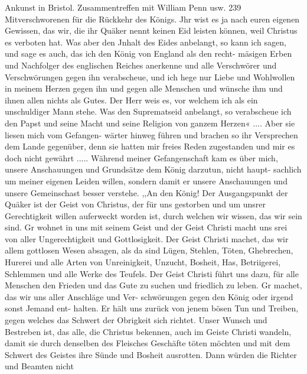 Ankunst in Bristol. Zusammentreffen mit William Penn usw. 239
Mitverschworenen für die Rückkehr des Königs. Jhr wist es ja
nach euren eigenen Gewissen, das wir, die ihr Quäker nennt
keinen Eid leisten können, weil Christus es verboten hat. Was
aber den Jnhalt des Eides anbelangt, so kann ich sagen, und
sage es auch, das ich den König von England als den recht-
mäsigen Erben und Nachfolger des englischen Reiches anerkenne
und alle Verschwörer und Verschwörungen gegen ihn verabscheue,
und ich hege nur Liebe und Wohlwollen in meinem Herzen gegen
ihn und gegen alle Menschen und wünsche ihm und ihnen allen
nichts als Gutes. Der Herr weis es, vor welchem ich als ein
unschuldiger Mann stehe. Was den Suprematseid anbelangt, so
verabscheue ich den Papst und seine Macht und seine Religion
von ganzem Herzen« .... Aber sie liesen mich vom Gefangen-
wärter hinweg führen und brachen so ihr Versprechen dem Lande
gegenüber, denn sie hatten mir freies Reden zugestanden und mir
es doch nicht gewährt .....
Während meiner Gefangenschaft kam es über mich, unsere
Anschauungen und Grundsätze dem König darzutun, nicht haupt-
sachlich um meiner eigenen Leiden willen, sondern damit er unsere
Anschauungen und unsere Gemeinschast besser verstehe.
,,An den König!
Der Ausgangspunkt der Quäker ist der Geist von Christus,
der für uns gestorben und um unsrer Gerechtigkeit willen auferweckt
worden ist, durch welchen wir wissen, das wir sein sind. Gr
wohnet in uns mit seinem Geist und der Geist Christi macht uns
srei von aller Ungerechtigkeit und Gottlosigkeit. Der Geist Christi
machet, das wir allem gottlosen Wesen absagen, als da sind
Lügen, Stehlen, Töten, Ghebrechen, Hurerei und alle Arten von
Unreinigkeit, Unzucht, Bosheit, Has, Betriigerei, Schlemmen und
alle Werke des Teufels. Der Geist Christi führt uns dazu, für
alle Menschen den Frieden und das Gute zu suchen und friedlich
zu leben. Gr machet, das wir uns aller Anschläge und Ver-
schwörungen gegen den König oder irgend sonst Jemand ent-
halten. Er hält uns zurück von jenem bösen Tun und Treiben,
gegen welches das Schwert der Obrigkeit sich richtet. Unser Wunsch
und Bestreben ist, das alle, die Christus bekennen, auch im Geiste
Christi wandeln, damit sie durch denselben des Fleisches Geschäfte
töten möchten und mit dem Schwert des Geistes ihre Sünde und
Bosheit ausrotten. Dann würden die Richter und Beamten nicht

